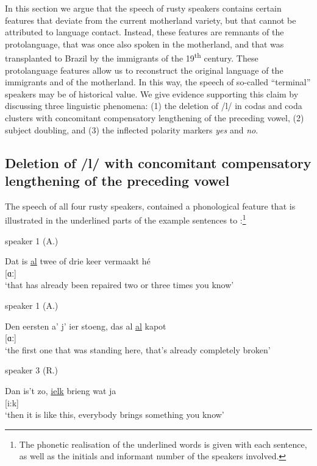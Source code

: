 \documentclass[output=paper,hidelinks,draftmode]{langscibook}
\begin{document}
In this section we argue that the speech of rusty speakers contains certain features that deviate from the current motherland variety, but that cannot be attributed to language contact. Instead, these features are remnants of the protolanguage, that was once also spoken in the motherland, and that was transplanted to Brazil by the immigrants of the 19\textsuperscript{th} century. These protolanguage features allow us to reconstruct the original language of the immigrants and of the motherland. In this way, the speech of so-called ``terminal'' speakers may be of historical value. We give evidence supporting this claim by discussing three linguistic phenomena: (1) the deletion of /l/ in codas and coda clusters with concomitant compensatory lengthening of the preceding vowel, (2) subject doubling, and (3) the inflected polarity markers \textit{yes} and \textit{no}.

\subsection{Deletion of /l/ with concomitant compensatory lengthening of the preceding vowel} 

The speech of all four rusty speakers, contained a phonological feature that is illustrated in the underlined parts of the example sentences  to :\footnote{The phonetic realisation of the underlined words is given with each sentence, as well as the initials and informant number of the speakers involved.}

\ea speaker 1 (A.)
\label{ex:schaffel:1}

\gll Dat is \ul{al} twee of drie keer vermaakt hé \\
{} {} [ɑː] {} {} {} {} {}\\
\glt ‘that has already been repaired two or three times you know’

\z 


\ea speaker 1 (A.)
\label{ex:schaffel:2}

\gll Den eersten a’ j’ ier stoeng, das al \ul{al} kapot \\
{} {} {} {} {} {} {} {} [ɑː] {}\\
\glt ‘the first one that was standing here, that’s already completely broken’

\z 


\ea speaker 3 (R.)
\label{ex:schaffel:3}

\gll Dan is’t zo, \ul{ielk} brieng wat ja \\
{} {} {} [i:k] {} {} {} \\
\glt ‘then it is like this, everybody brings something you know’
\end{document}
